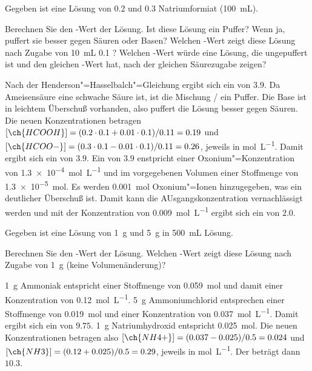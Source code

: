 \documentclass[DIV11]{scrartcl}
\begin{document}
\begin{question}[ID=HCOOH]
Gegeben ist eine Lösung  von  \SI{0.2}{\Molar}  und \SI{0.3}{\Molar}
Natriumformiat (\SI{100}{\milli\liter}).
\begin{tasks}
  \task Berechnen Sie den \pH-Wert der Lösung.
  \task Ist diese Lösung ein Puffer? Wenn ja, puffert sie besser gegen Säuren
    oder Basen?
  \task Welchen \pH-Wert zeigt diese Lösung nach Zugabe von
    \SI{10}{\milli\liter} \SI{0.1}{\Molar} ?
  \task Welchen \pH-Wert würde eine Lösung, die ungepuffert ist und den
    gleichen \pH-Wert hat, nach der gleichen Säurezugabe zeigen?
\end{tasks}
\end{question}
\begin{solution}
  \begin{tasks}
    \task Nach der Henderson"=Hasselbalch"=Gleichung ergibt sich ein \pH{} von
      $3.9$.
    \task Da Ameisensäure eine schwache Säure ist, ist die Mischung
      \slash{} ein Puffer.  Die Base ist in leichtem
      Überschuß vorhanden, also puffert die Lösung besser gegen Säuren.
    \task Die neuen Konzentrationen betragen $[\ch{HCOOH}] =
      (0.2\cdot0.1+0.01\cdot0.1)/0.11 = 0.19$ und $[\ch{HCOO-}] =
      (0.3\cdot0.1-0.01\cdot0.1)/0.11 = 0.26$, jeweils in
      \si{\mole\per\liter}.  Damit ergibt sich ein \pH{} von $3.9$.
    \task Ein \pH{} von $3.9$ enstpricht einer Oxonium"=Konzentration von
      \SI{1.3e-4}{\mole\per\liter} und im vorgegebenen Volumen einer
      Stoffmenge von \SI{1.3e-5}{\mole}.  Es werden \SI{0.001}{\mole}
      Oxonium"=Ionen hinzugegeben, was ein deutlicher Überschuß ist.  Damit
      kann die AUsgangskonzentration vernachlässigt werden und mit der
      Konzentration von \SI{0.009}{\mole\per\liter} ergibt sich ein \pH{} von
      $2.0$.
  \end{tasks}
\end{solution}

\begin{question}
Gegeben ist eine Lösung von \SI{1}{\gram}  und \SI{5}{\gram}
 in \SI{500}{\milli\liter} Lösung.
\begin{tasks}
  \task Berechnen Sie den \pH-Wert der Lösung.
  \task Welchen \pH-Wert zeigt diese Lösung nach Zugabe von \SI{1}{\gram}
     (keine Volumenänderung)?
\end{tasks}
\end{question}
\begin{solution}
  \begin{tasks}
    \task \SI{1}{\gram} Ammoniak entspricht einer Stoffmenge von
      \SI{0.059}{\mole} und damit einer Konzentration von
      \SI{0.12}{\mole\per\liter}.  \SI{5}{\gram} Ammoniumchlorid entsprechen
      einer Stoffmenge von \SI{0.019}{\mole} und einer Konzentration von
      \SI{0.037}{\mole\per\liter}.  Damit ergibt sich ein \pH{} von $9.75$.
    \task \SI{1}{\gram} Natriumhydroxid entspricht \SI{0.025}{\mole}.  Die
      neuen Konzentrationen betragen also $[\ch{NH4+}] = (0.037-0.025)/0.5 =
      0.024$ und $[\ch{NH3}] = (0.12+0.025)/0.5 = 0.29$, jeweils in
      \si{\mole\per\liter}.  Der \pH{} beträgt dann $10.3$.
  \end{tasks}
\end{solution}
\end{document}
